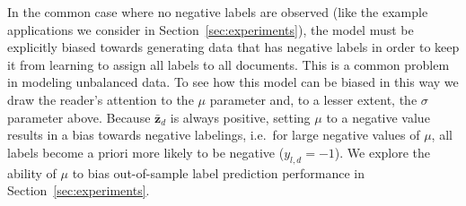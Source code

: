 

In the common case where no negative labels are observed (like the example applications we consider in Section~\ref{sec:experiments}), the model must be explicitly biased towards generating data that has negative labels in order to keep it from learning to assign all labels to all documents.   This is a common problem in modeling unbalanced data.  To see how this model can be biased in this way we draw the reader's attention to the $\mu$ parameter and, to a lesser extent, the $\sigma$ parameter above.  Because $\bar{\mathbf{z}}_d$ is always positive, setting $\mu$ to a negative value results in a bias towards negative labelings, i.e.~for large negative values of $\mu$, all labels become a priori more likely to be negative ($y_{l,d}=-1$).  We explore the ability of $\mu$ to bias out-of-sample label prediction performance in Section~\ref{sec:experiments}.


